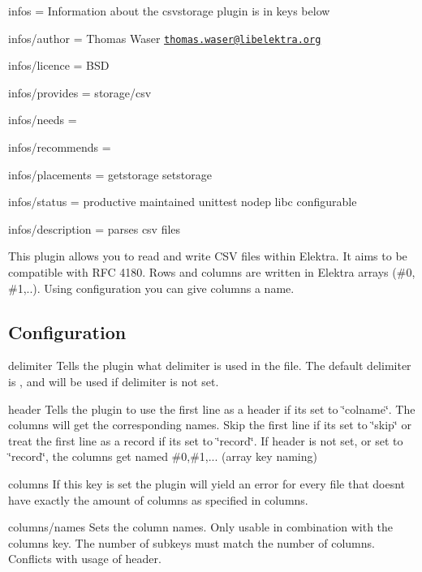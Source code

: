
\begin{DoxyItemize}
\item infos = Information about the csvstorage plugin is in keys below
\item infos/author = Thomas Waser \href{mailto:thomas.waser@libelektra.org}{\tt thomas.\+waser@libelektra.\+org}
\item infos/licence = B\+SD
\item infos/provides = storage/csv
\item infos/needs =
\item infos/recommends =
\item infos/placements = getstorage setstorage
\item infos/status = productive maintained unittest nodep libc configurable
\item infos/description = parses csv files
\end{DoxyItemize}

This plugin allows you to read and write C\+SV files within Elektra. It aims to be compatible with R\+FC 4180. Rows and columns are written in Elektra arrays ({\ttfamily \#0}, {\ttfamily \#1},..). Using configuration you can give columns a name.

\subsection*{Configuration}

{\ttfamily delimiter} Tells the plugin what delimiter is used in the file. The default delimiter is {\ttfamily ,} and will be used if {\ttfamily delimiter} is not set.

{\ttfamily header} Tells the plugin to use the first line as a header if it\textquotesingle{}s set to \char`\"{}colname\char`\"{}. The columns will get the corresponding names. Skip the first line if it\textquotesingle{}s set to \char`\"{}skip\char`\"{} or treat the first line as a record if it\textquotesingle{}s set to \char`\"{}record\char`\"{}. If {\ttfamily header} is not set, or set to \char`\"{}record\char`\"{}, the columns get named \#0,\#1,... (array key naming)

{\ttfamily columns} If this key is set the plugin will yield an error for every file that doesn\textquotesingle{}t have exactly the amount of columns as specified in {\ttfamily columns}.

{\ttfamily columns/names} Sets the column names. Only usable in combination with the {\ttfamily columns} key. The number of subkeys must match the number of columns. Conflicts with usage of {\ttfamily header}.

